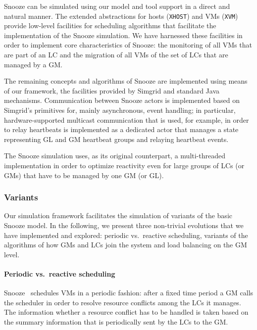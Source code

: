 Snooze can be simulated using our model and tool support in a direct
and natural manner. The extended abstractions  for hosts (\texttt{XHOST}) and VMs
(\texttt{XVM}) provide low-level facilities for scheduling algorithms
that facilitate the implementation of the Snooze simulation. We have
harnessed these facilities in order to implement core characteristics
of Snooze: the monitoring of all VMs that are part of an LC and the
migration of all VMs of the set of LCs that are managed by a GM.

The remaining concepts and algorithms of Snooze are implemented using
means of our framework, the facilities provided by Simgrid and
standard Java mechanisms. Communication between Snooze actors is
implemented based on Simgrid's primitives for, mainly asynchronous,
event handling; in particular, hardware-supported multicast
communication that is used, for example, in order to relay heartbeats
is implemented as a dedicated actor that manages a state representing
GL and GM heartbeat groups and relaying heartbeat events.

The Snooze simulation uses, as its original counterpart, a
multi-threaded implementation in order to optimize reactivity even for
large groups of LCs (or GMs) that have to be managed by one GM (or
GL).

\subsubsection{Variants}

Our simulation framework facilitates the simulation of variants of the
basic Snooze model. In the following, we present three non-trivial
evolutions that we have implemented and explored: periodic vs.\
reactive scheduling, variants of the algorithms of how GMs and LCs
join the system and load balancing on the GM level.

\paragraph{Periodic vs.\ reactive scheduling}

Snooze~\cite{feller:ccgrid12} schedules VMs in a periodic fashion:
after a fixed time period a GM calls the scheduler in order to resolve
resource conflicts among the LCs it manages. The information whether a
resource conflict has to be handled is taken based on the summary
information that is periodically sent by the LCs to the GM.

